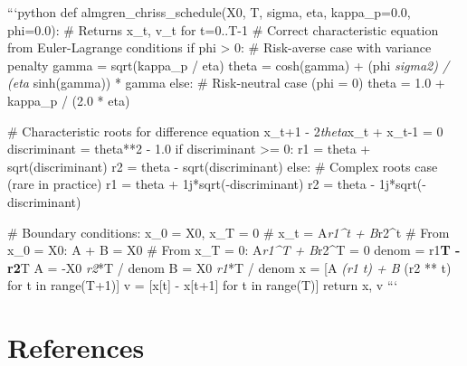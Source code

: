 \documentclass[11pt,a4paper]{article}
\begin{document}
```python
def almgren\_chriss\_schedule(X0, T, sigma, eta, kappa\_p=0.0, phi=0.0):
    \# Returns x\_t, v\_t for t=0..T-1
    \# Correct characteristic equation from Euler-Lagrange conditions
    if phi > 0:
        \# Risk-averse case with variance penalty
        gamma = sqrt(kappa\_p / eta)  
        theta = cosh(gamma) + (phi \textit{ sigma}\textit{2) / (eta } sinh(gamma)) * gamma
    else:
        \# Risk-neutral case (phi = 0)
        theta = 1.0 + kappa\_p / (2.0 * eta)
    
    \# Characteristic roots for difference equation x\_{t+1} - 2\textit{theta}x\_t + x\_{t-1} = 0
    discriminant = theta**2 - 1.0
    if discriminant >= 0:
        r1 = theta + sqrt(discriminant) 
        r2 = theta - sqrt(discriminant)
    else:
        \# Complex roots case (rare in practice)
        r1 = theta + 1j*sqrt(-discriminant)
        r2 = theta - 1j*sqrt(-discriminant)
    
    \# Boundary conditions: x\_0 = X0, x\_T = 0
    \# x\_t = A\textit{r1^t + B}r2^t
    \# From x\_0 = X0: A + B = X0
    \# From x\_T = 0:  A\textit{r1^T + B}r2^T = 0
    denom = r1\textbf{T - r2}T
    A = -X0 \textit{ r2}*T / denom
    B = X0 \textit{ r1}*T / denom
    x = [A \textit{ (r1 }\textit{ t) + B } (r2 ** t) for t in range(T+1)]
    v = [x[t] - x[t+1] for t in range(T)]
    return x, v
```


\section{References}

\end{document}
